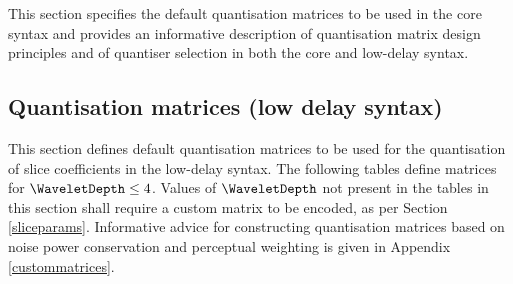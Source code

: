 \label{quantmatrices}

This section specifies the default quantisation matrices to be used
in the core syntax and provides an informative description of quantisation
matrix design principles and of quantiser selection in both the core
and low-delay syntax.

\subsection{Quantisation matrices (low delay syntax)}
\label{defaultquantmatrices}

This section defines default quantisation matrices to be used 
for the quantisation of slice coefficients in the low-delay syntax.
The following tables define matrices for $\WaveletDepth\leq 4$. 
Values of $\WaveletDepth$ not present in the tables
in this section shall require a custom matrix to be encoded, 
as per Section \ref{sliceparams}. Informative advice for 
constructing quantisation matrices based on noise power 
conservation and perceptual weighting is given in 
Appendix \ref{custommatrices}.

